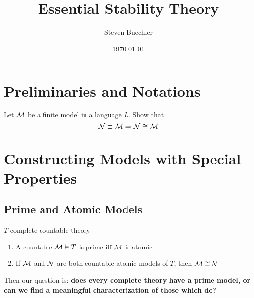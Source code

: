 \documentclass[11pt]{article}
\author{Steven Buechler}
\date{\today}
\title{Essential Stability Theory}
\begin{document}
\maketitle
\tableofcontents

\section{Preliminaries and Notations}
\label{sec:org95f6908}
\begin{exercise}
\label{ex1.1.11}
Let \(\mathcal{M}\) be a finite model in a language \(L\). Show that
\begin{equation*}
\mathcal{N}\equiv\mathcal{M}\Rightarrow\mathcal{N}\cong\mathcal{M}
\end{equation*}
\end{exercise}
\section{Constructing Models with Special Properties}
\label{sec:org49cfa31}
\subsection{Prime and Atomic Models}
\label{sec:orgcd10a86}
\begin{proposition}[]
\(T\) complete countable theory
\begin{enumerate}
\item A countable \(\mathcal{M}\vDash T\) is prime iff \(\mathcal{M}\) is atomic
\item If \(\mathcal{M}\) and \(\mathcal{N}\) are both countable atomic models of \(T\), then \(\mathcal{M}\cong\mathcal{N}\)
\end{enumerate}
\end{proposition}

Then our question is: \textbf{does every complete theory have a prime model, or can we find a meaningful}
\textbf{characterization of those which do?}
\end{document}
